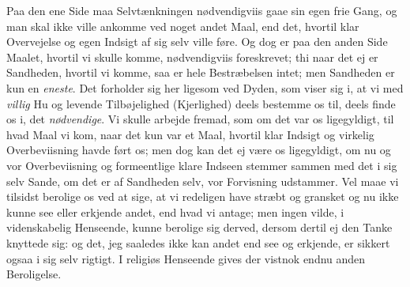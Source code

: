 \documentclass[12pt,a4paper]{book}
\newcommand{\apage}[1]{\marginnote{\footnotesize\textit{[#1]}}}
\begin{document}
Paa den ene Side maa Selvtænkningen nødvendigviis gaae sin egen frie Gang, og man
skal ikke ville ankomme ved noget andet Maal, end det, hvortil klar Overvejelse og
egen Indsigt af sig selv ville føre. Og dog er paa den anden Side Maalet, hvortil
vi skulle komme, nødvendigviis foreskrevet; thi naar det ej er Sandheden, hvortil
vi komme, saa er hele Bestræbelsen intet; men Sandheden er kun en \emph{eneste}. Det
forholder sig her ligesom ved Dyden, som viser sig i, at vi med \emph{villig} Hu og
levende Tilbøjelighed (Kjerlighed) deels bestemme os til, deels finde os i, det
\emph{nødvendige}. Vi skulle arbejde fremad, som om det var os ligegyldigt, til hvad Maal
vi kom, naar det kun var et Maal, hvortil klar Indsigt og virkelig Overbeviisning
havde ført os; \apage{169} men dog kan det ej være os ligegyldigt, om nu og vor Overbeviisning
og formeentlige klare Indseen stemmer sammen med det i sig selv Sande, om det er
af Sandheden selv, vor Forvisning udstammer. Vel maae vi tilsidst berolige os ved
at sige, at vi redeligen have stræbt og gransket og nu ikke kunne see eller
erkjende andet, end hvad vi antage; men ingen vilde, i videnskabelig Henseende,
kunne berolige sig derved, dersom dertil ej den Tanke knyttede sig: og det, jeg
saaledes ikke kan andet end see og erkjende, er sikkert ogsaa i sig selv rigtigt. I
religiøs Henseende gives der vistnok endnu anden Beroligelse.
\end{document}
